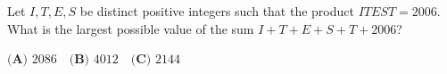 Let $I,T,E,S$ be distinct positive integers such that the product $ITEST=2006$. What is the largest possible value of the sum $I+T+E+S+T+2006$?

$\textbf{(A) } 2086\quad\textbf{(B) } 4012\quad\textbf{(C) } 2144$
